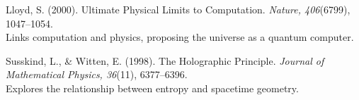 \documentclass[12pt]{article}
\begin{document}
\begin{thebibliography}{99}
Lloyd, S. (2000). Ultimate Physical Limits to Computation. \textit{Nature, 406}(6799), 1047–1054. \\
Links computation and physics, proposing the universe as a quantum computer.

Susskind, L., \& Witten, E. (1998). The Holographic Principle. \textit{Journal of Mathematical Physics, 36}(11), 6377–6396. \\
Explores the relationship between entropy and spacetime geometry.

\end{thebibliography}
\end{document}
